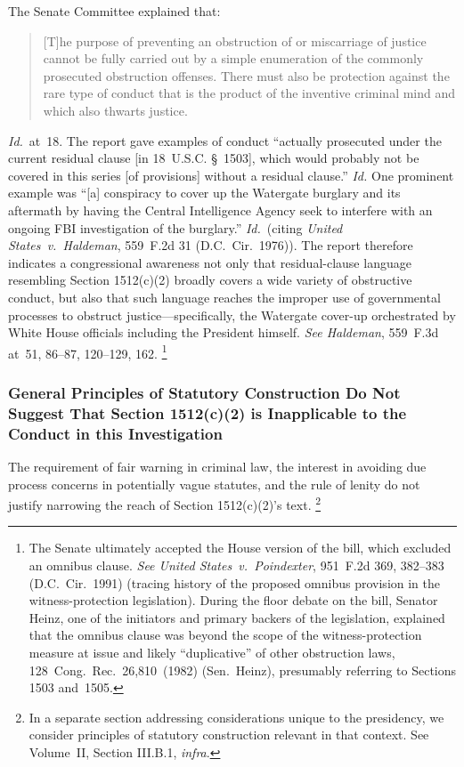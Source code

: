 The Senate Committee explained that:

\begin{quote}
[T]he purpose of preventing an obstruction of or miscarriage of justice cannot be fully carried out by a simple enumeration of the commonly prosecuted obstruction offenses.
There must also be protection against the rare type of conduct that is the product of the inventive criminal mind and which also thwarts justice.
\end{quote}

\textit{Id.}~at~18.
The report gave examples of conduct ``actually prosecuted under the current residual clause [in 18~U.S.C. \S~1503], which would probably not be covered in this series [of provisions] without a residual clause.''
\textit{Id.}
One prominent example was ``[a] conspiracy to cover up the Watergate burglary and its aftermath by having the Central Intelligence Agency seek to interfere with an ongoing FBI investigation of the burglary.''
\textit{Id.}~(citing \textit{United States~v.\ Haldeman}, 559~F.2d 31 (D.C.~Cir.~1976)).
The report therefore indicates a congressional awareness not only that residual-clause language resembling Section 1512(c)(2) broadly covers a wide variety of obstructive conduct, but also that such language reaches the improper use of governmental processes to obstruct justice---specifically, the Watergate cover-up orchestrated by White House officials including the President himself.
\textit{See Haldeman}, 559~F.3d at~51, 86--87, 120--129, 162.%
\footnote{The Senate ultimately accepted the House version of the bill, which excluded an omnibus clause.
\textit{See United States~v.\ Poindexter}, 951~F.2d 369, 382--383 (D.C.~Cir.~1991) (tracing history of the proposed omnibus provision in the witness-protection legislation).
During the floor debate on the bill, Senator Heinz, one of the initiators and primary backers of the legislation, explained that the omnibus clause was beyond the scope of the witness-protection measure at issue and likely ``duplicative'' of other obstruction laws, 128~Cong.\ Rec.\ 26,810~(1982) (Sen.~Heinz), presumably referring to Sections 1503 and~1505.}

\subsubsection{General Principles of Statutory Construction Do Not Suggest That Section 1512(c)(2) is Inapplicable to the Conduct in this Investigation}

The requirement of fair warning in criminal law, the interest in avoiding due process concerns in potentially vague statutes, and the rule of lenity do not justify narrowing the reach of Section 1512(c)(2)'s text.%
\footnote{In a separate section addressing considerations unique to the presidency, we consider principles of statutory construction relevant in that context.
See Volume~II, Section III.B.1, \textit{infra}.}

